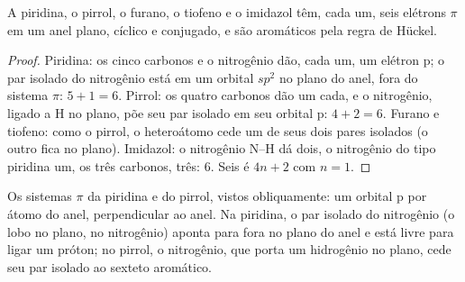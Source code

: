 \begin{proposition}\label{prop:b3:heterocycles:sextet}
A piridina, o pirrol, o furano, o tiofeno e o imidazol têm, cada um, seis elétrons $\pi$ em
um anel plano, cíclico e conjugado, e são aromáticos pela regra de Hückel.
\end{proposition}

\begin{proof}
Piridina: os cinco carbonos e o nitrogênio dão, cada um, um elétron p; o par isolado do
nitrogênio está em um orbital $sp^2$ no plano do anel, fora do sistema $\pi$: $5 + 1 = 6$.
Pirrol: os quatro carbonos dão um cada, e o nitrogênio, ligado a H no plano,
põe seu par isolado em seu orbital p: $4 + 2 = 6$. Furano e tiofeno: como o pirrol, o
heteroátomo cede um de seus dois pares isolados (o outro fica no plano). Imidazol:
o nitrogênio N--H dá dois, o nitrogênio do tipo piridina um, os três carbonos,
três: 6. Seis é $4n + 2$ com $n = 1$.
\end{proof}

\begin{omfigure}

{\small Os sistemas $\pi$ da piridina e do pirrol, vistos obliquamente: um orbital p por
átomo do anel, perpendicular ao anel. Na piridina, o par isolado do nitrogênio (o lobo no plano, no
nitrogênio) aponta para fora no plano do anel e está livre para ligar um próton; no pirrol,
o nitrogênio, que porta um hidrogênio no plano, cede seu par isolado ao
sexteto aromático.}
\end{omfigure}

